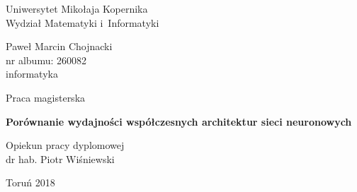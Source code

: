 \documentclass[12pt,a4paper,twoside,titlepage,openright]{book}
\begin{document}

\begin{titlepage}


\vspace*{1cm}
\begin{center}
\begin{Large}
Uniwersytet Mikołaja Kopernika\\[1mm]
Wydział Matematyki i~Informatyki\\[1mm]
\end{Large}
\end{center}

\vfill

\begin{center}
{\Large Paweł Marcin Chojnacki}\\
nr albumu: 260082\\
informatyka
\end{center}

\vfill

\begin{center}
{\Large Praca magisterska}
\end{center}

\vspace{0.5cm}

\begin{center}
{\Huge \textbf{Porównanie wydajności współczesnych architektur sieci neuronowych}}
\end{center}

\vspace{2cm}
\hfill
\begin{minipage}{6.5cm}
Opiekun pracy dyplomowej\\
dr hab. Piotr Wiśniewski
\end{minipage}

\vfill

\begin{center}
Toruń 2018
\end{center}

\end{titlepage}

\clearpage{\pagestyle{empty}\cleardoublepage}

\tableofcontents

\end{document}

